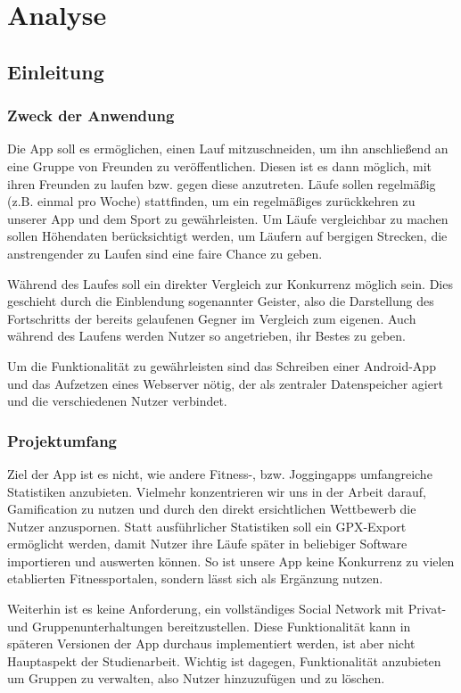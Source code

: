 \section{Analyse}\label{kapitel4}
\subsection{Einleitung}
\subsubsection{Zweck der Anwendung}
Die App soll es ermöglichen, einen Lauf mitzuschneiden, um ihn anschließend an eine Gruppe von Freunden zu veröffentlichen. Diesen ist es dann möglich, mit ihren Freunden zu laufen bzw. gegen diese anzutreten. Läufe sollen regelmäßig (z.B. einmal pro Woche) stattfinden, um ein regelmäßiges zurückkehren zu unserer App und dem Sport zu gewährleisten. Um Läufe vergleichbar zu machen sollen Höhendaten berücksichtigt werden, um Läufern auf bergigen Strecken, die anstrengender zu Laufen sind eine faire Chance zu geben.

Während des Laufes soll ein direkter Vergleich zur Konkurrenz möglich sein. Dies geschieht durch die Einblendung sogenannter Geister, also die Darstellung des Fortschritts der bereits gelaufenen Gegner im Vergleich zum eigenen. Auch während des Laufens werden Nutzer so angetrieben, ihr Bestes zu geben.

Um die Funktionalität zu gewährleisten sind das Schreiben einer Android-App und das Aufzetzen eines Webserver nötig, der als zentraler Datenspeicher agiert und die verschiedenen Nutzer verbindet.
\subsubsection{Projektumfang}
Ziel der App ist es nicht, wie andere Fitness-, bzw. Joggingapps umfangreiche Statistiken anzubieten. Vielmehr konzentrieren wir uns in der Arbeit darauf, Gamification zu nutzen und durch den direkt ersichtlichen Wettbewerb die Nutzer anzuspornen. Statt ausführlicher Statistiken soll ein GPX-Export ermöglicht werden, damit Nutzer ihre Läufe später in beliebiger Software importieren und auswerten können. So ist unsere App keine Konkurrenz zu vielen etablierten Fitnessportalen, sondern lässt sich als Ergänzung nutzen.

Weiterhin ist es keine Anforderung, ein vollständiges Social Network mit Privat- und Gruppenunterhaltungen bereitzustellen. Diese Funktionalität kann in späteren Versionen der App durchaus implementiert werden, ist aber nicht Hauptaspekt der Studienarbeit. Wichtig ist dagegen, Funktionalität anzubieten um Gruppen zu verwalten, also Nutzer hinzuzufügen und zu löschen.

